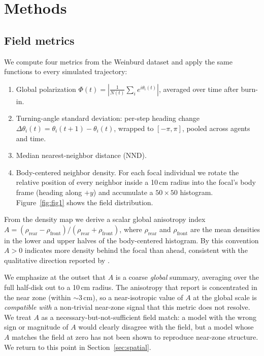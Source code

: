 \documentclass[11pt]{article}
\begin{document}
\section{Methods}
\label{sec:methods}

\subsection{Field metrics}

We compute four metrics from the Weinburd dataset and apply the same
functions to every simulated trajectory:

\begin{enumerate}
\item Global polarization $\Phi(t) = \left| \frac{1}{N(t)} \sum_i
  e^{i\theta_i(t)} \right|$, averaged over time after burn-in.
\item Turning-angle standard deviation: per-step heading change
  $\Delta\theta_i(t) = \theta_i(t+1) - \theta_i(t)$, wrapped to
  $[-\pi, \pi]$, pooled across agents and time.
\item Median nearest-neighbor distance (NND).
\item Body-centered neighbor density. For each focal individual we
  rotate the relative position of every neighbor inside a 10\,cm radius
  into the focal's body frame (heading along $+y$) and accumulate a
  $50 \times 50$ histogram. Figure~\ref{fig:fig1} shows the field
  distribution.
\end{enumerate}

From the density map we derive a scalar global anisotropy index
$A = (\rho_\text{rear} - \rho_\text{front}) / (\rho_\text{rear} +
\rho_\text{front})$, where $\rho_\text{rear}$ and $\rho_\text{front}$ are
the mean densities in the lower and upper halves of the body-centered
histogram. By this convention $A > 0$ indicates more density behind the
focal than ahead, consistent with the qualitative direction reported by
\citet{weinburd2024}.

We emphasize at the outset that $A$ is a coarse \emph{global} summary,
averaging over the full half-disk out to a 10\,cm radius. The anisotropy
that \citet{weinburd2024} report is concentrated in the near zone (within
$\sim 3$\,cm), so a near-isotropic value of $A$ at the global scale is
\emph{compatible with} a non-trivial near-zone signal that this metric
does not resolve. We treat $A$ as a necessary-but-not-sufficient field
match: a model with the wrong sign or magnitude of $A$ would clearly
disagree with the field, but a model whose $A$ matches the field at zero
has not been shown to reproduce near-zone structure. We return to this
point in Section~\ref{sec:spatial}.
\end{document}
